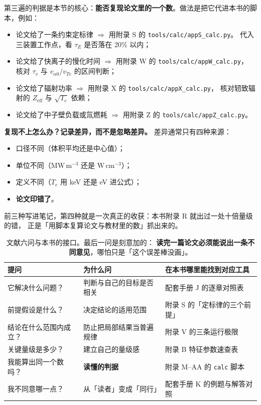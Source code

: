 第三遍的判据是本节的核心：\textbf{能否复现论文里的一个数}。做法是把它代进本书的脚本，例如：

\begin{itemize}
\item 论文给了一条约束定标律 $\Rightarrow$ 用附录 S 的 \texttt{tools/\allowbreak{}calc/\allowbreak{}appS\_calc.py}。
代入三装置工作点，看 $\tau_E$ 是否落在 20\% 以内；
\item 论文给了快离子的慢化时间 $\Rightarrow$ 用附录 W 的 \texttt{tools/\allowbreak{}calc/\allowbreak{}appW\_calc.py}，
核对 $\tau_v$ 与 $v_{\alpha 0}/v_{Te}$ 的区间判断；
\item 论文给了辐射功率 $\Rightarrow$ 用附录 X 的 \texttt{tools/\allowbreak{}calc/\allowbreak{}appX\_calc.py}，
核对轫致辐射的 $Z_{\mathrm{eff}}$ 与 $\sqrt{T_e}$ 依赖；
\item 论文给了中子壁负载或氚燃耗 $\Rightarrow$ 用附录 Z 的 \texttt{tools/\allowbreak{}calc/\allowbreak{}appZ\_calc.py}。
\end{itemize}

\textbf{复现不上怎么办？记录差异，而不是忽略差异。} 差异通常只有四种来源：
\begin{itemize}
\item 口径不同（体积平均还是中心值）；
\item 单位不同（$\mathrm{MW\,m^{-3}}$ 还是 $\mathrm{W\,cm^{-3}}$）；
\item 定义不同（$T_e$ 用 keV 还是 eV 进公式）；
\item \textbf{论文印错了}。
\end{itemize}
前三种写进笔记，第四种就是一次真正的收获：本书附录 R 就出过一处十倍量级的错，
正是「用脚本复算论文与教材里的数」抓出来的。

\begin{table}[htbp]
\centering
\small
\caption{文献六问与本书的接口。最后一问是刻意加的：
\textbf{读完一篇论文必须能说出一条不同意见}，哪怕只是「这个误差棒没画」。}
\label{tab:app-i-paperquestions}
\begin{tabular}{p{4.6cm}p{5.2cm}p{5.0cm}}
\toprule
提问 & 为什么问 & 在本书哪里能找到对应工具 \\
\midrule
它解决什么问题？ & 判断与自己的目标是否相关 & 配套手册 J 的逐章对照表 \\
前提假设是什么？ & 决定结论的适用范围 & 附录 S 的「定标律的三个前提」 \\
结论在什么范围内成立？ & 防止把局部结果当普遍规律 & 附录 V 的三条运行极限 \\
关键量级是多少？ & 建立自己的量级感 & 附录 B 特征参数速查表 \\
我能算出同一个数吗？ & \textbf{读懂的判据} & 附录 M--AA 的 \texttt{calc} 脚本 \\
我不同意哪一点？ & 从「读者」变成「同行」 & 配套手册 K 的例题与解答对照 \\
\bottomrule
\end{tabular}

\end{table}

